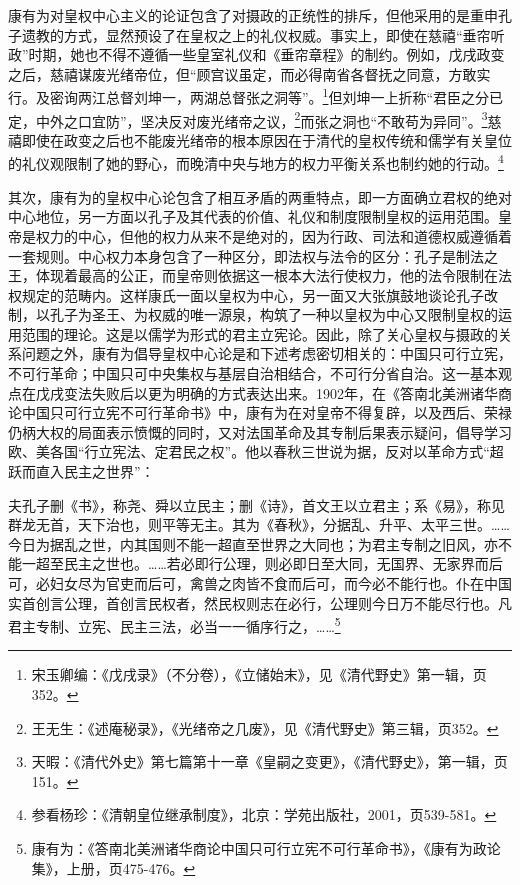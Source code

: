 \documentclass[a4paper, 12pt, openright]{ctexbook}
\renewenvironment{quote}
  {\list{}{\rightmargin2\ccwd \leftmargin2\ccwd \itemindent=2\ccwd \listparindent=2\ccwd}%
   \item\relax\small\kaishu\color{black}}
  {\endlist}
\begin{document}
康有为对皇权中心主义的论证包含了对摄政的正统性的排斥，但他采用的是重申孔子遗教的方式，显然预设了在皇权之上的礼仪权威。事实上，即使在慈禧“垂帘听政”时期，她也不得不遵循一些皇室礼仪和《垂帘章程》的制约。例如，戊戌政变之后，慈禧谋废光绪帝位，但“顾宫议虽定，而必得南省各督抚之同意，方敢实行。及密询两江总督刘坤一，两湖总督张之洞等”。\footnote{宋玉卿编：《戊戌录》（不分卷），《立储始末》，见《清代野史》第一辑，页352。}但刘坤一上折称“君臣之分已定，中外之口宜防”，坚决反对废光绪帝之议，\footnote{王无生：《述庵秘录》，《光绪帝之几废》，见《清代野史》第三辑，页352。}而张之洞也“不敢苟为异同”。\footnote{天暇：《清代外史》第七篇第十一章《皇嗣之变更》，《清代野史》，第一辑，页151。}慈禧即使在政变之后也不能废光绪帝的根本原因在于清代的皇权传统和儒学有关皇位的礼仪观限制了她的野心，而晚清中央与地方的权力平衡关系也制约她的行动。\footnote{参看杨珍：《清朝皇位继承制度》，北京：学苑出版社，2001，页539-581。}

其次，康有为的皇权中心论包含了相互矛盾的两重特点，即一方面确立君权的绝对中心地位，另一方面以孔子及其代表的价值、礼仪和制度限制皇权的运用范围。皇帝是权力的中心，但他的权力从来不是绝对的，因为行政、司法和道德权威遵循着一套规则。中心权力本身包含了一种区分，即法权与法令的区分：孔子是制法之王，体现着最高的公正，而皇帝则依据这一根本大法行使权力，他的法令限制在法权规定的范畴内。这样康氏一面以皇权为中心，另一面又大张旗鼓地谈论孔子改制，以孔子为圣王、为权威的唯一源泉，构筑了一种以皇权为中心又限制皇权的运用范围的理论。这是以儒学为形式的君主立宪论。因此，除了关心皇权与摄政的关系问题之外，康有为倡导皇权中心论是和下述考虑密切相关的：中国只可行立宪，不可行革命；中国只可中央集权与基层自治相结合，不可行分省自治。这一基本观点在戊戌变法失败后以更为明确的方式表达出来。1902年，在《答南北美洲诸华商论中国只可行立宪不可行革命书》中，康有为在对皇帝不得复辟，以及西后、荣禄仍柄大权的局面表示愤慨的同时，又对法国革命及其专制后果表示疑问，倡导学习欧、美各国“行立宪法、定君民之权”。他以春秋三世说为据，反对以革命方式“超跃而直入民主之世界”：

\begin{quote}
夫孔子删《书》，称尧、舜以立民主；删《诗》，首文王以立君主；系《易》，称见群龙无首，天下治也，则平等无主。其为《春秋》，分据乱、升平、太平三世。……今日为据乱之世，内其国则不能一超直至世界之大同也；为君主专制之旧风，亦不能一超至民主之世也。……若必即行公理，则必即日至大同，无国界、无家界而后可，必妇女尽为官吏而后可，禽兽之肉皆不食而后可，而今必不能行也。仆在中国实首创言公理，首创言民权者，然民权则志在必行，公理则今日万不能尽行也。凡君主专制、立宪、民主三法，必当一一循序行之，……\footnote{康有为：《答南北美洲诸华商论中国只可行立宪不可行革命书》，《康有为政论集》，上册，页475-476。}
\end{quote}
\end{document}
